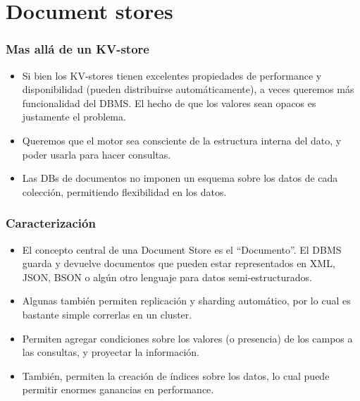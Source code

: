 \section{Document stores}

\begin{frame}
\frametitle{Mas allá de un KV-store}
\begin{itemize}

\item	Si bien los KV-stores tienen excelentes propiedades de performance
	y disponibilidad (pueden distribuirse automáticamente), a veces
	queremos más funcionalidad del DBMS. El hecho de que los valores
	sean opacos es justamente el problema.
	\pause

\item	Queremos que el motor sea consciente de la estructura interna
	del dato, y poder usarla para hacer consultas.
	\pause

\item	Las DBs de documentos no imponen un esquema sobre los datos de
	cada colección, permitiendo flexibilidad en los datos.
\end{itemize}
\end{frame}

\begin{frame}
\frametitle{Caracterización}
\begin{itemize}
\item	El concepto central de una Document Store es el ``Documento''.
	El DBMS guarda y devuelve documentos que pueden estar representados
	en XML, JSON, BSON o algún otro lenguaje para datos semi-estructurados.
	\pause

\item	Algunas también permiten replicación y sharding automático, por lo
	cual es bastante simple correrlas en un cluster.
	\pause

\item	Permiten agregar condiciones sobre los valores (o presencia) de los
	campos a las consultas, y proyectar la información.
	\pause

\item	También, permiten la creación de índices sobre los datos, lo cual
	puede permitir enormes ganancias en performance.
\end{itemize}
\end{frame}
